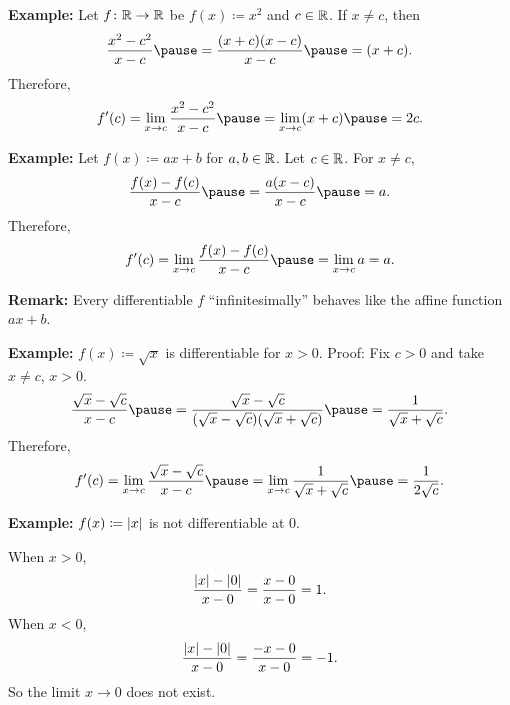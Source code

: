 \documentclass[10pt,aspectratio=149]{beamer}
\begin{document}
\begin{frame}
\textbf{Example:}
Let $f \colon {\mathbb{R}} \to {\mathbb{R}}$ be $f(x) \coloneqq x^2$ and $c \in {\mathbb{R}}$.
\pause
If $x \not= c$, then
\begin{equation*}
\frac{x^2-c^2}{x-c}
\pause
=
\frac{(x+c)(x-c)}{x-c}
\pause
=
(x+c) .
\end{equation*}
\pause
Therefore,
\begin{equation*}
f'(c)
= 
\lim_{x\to c} \frac{x^2-c^2}{x-c}
\pause
=
\lim_{x\to c} (x+c)
\pause
= 2c.
\end{equation*}

\pause
\medskip

\textbf{Example:}
Let $f(x) \coloneqq ax + b$ for $a, b \in {\mathbb{R}}$.
\pause
Let $c \in {\mathbb{R}}$.
\pause
For $x \not=c$,
\begin{equation*}
\frac{f(x)-f(c)}{x-c}
\pause
=
\frac{a(x-c)}{x-c}
\pause
= a .
\end{equation*}
\pause
Therefore,
\begin{equation*}
f'(c)
=
\lim_{x\to c} 
\frac{f(x)-f(c)}{x-c}
\pause
=
\lim_{x\to c} 
a
= a.
\end{equation*}

\pause

\textbf{Remark:}
Every differentiable $f$ ``infinitesimally'' behaves like
the affine function $ax + b$.

\end{frame}

\begin{frame}

\textbf{Example:}
$f(x) \coloneqq \sqrt{x}$ is differentiable for $x > 0$.
\pause
Proof:
Fix $c > 0$ and take $x \not= c$, $x > 0$.
\pause
\begin{equation*}
\frac{\sqrt{x}-\sqrt{c}}{x-c}
\pause
=
\frac{\sqrt{x}-\sqrt{c}}{(\sqrt{x}-\sqrt{c})(\sqrt{x}+\sqrt{c})}
\pause
=
\frac{1}{\sqrt{x}+\sqrt{c}} .
\end{equation*}
\pause
Therefore,
\begin{equation*}
f'(c)
=
\lim_{x\to c}
\frac{\sqrt{x}-\sqrt{c}}{x-c}
\pause
=
\lim_{x\to c}
\frac{1}{\sqrt{x}+\sqrt{c}}
\pause
=
\frac{1}{2\sqrt{c}} .
\end{equation*}

\pause
\medskip

\textbf{Example:}
$f(x) \coloneqq \left\lvert {x} \right\rvert$ is not differentiable at $0$.

\pause
When $x > 0$,
\begin{equation*}
\frac{\left\lvert {x} \right\rvert-\left\lvert {0} \right\rvert}{x-0} =
\frac{x-0}{x-0} = 1 .
\end{equation*}
\pause
When $x < 0$,
\begin{equation*}
\frac{\left\lvert {x} \right\rvert-\left\lvert {0} \right\rvert}{x-0} =
\frac{-x-0}{x-0} = -1 .
\end{equation*}
\pause
So the limit $x \to 0$ does not exist.

\end{frame}
\end{document}
